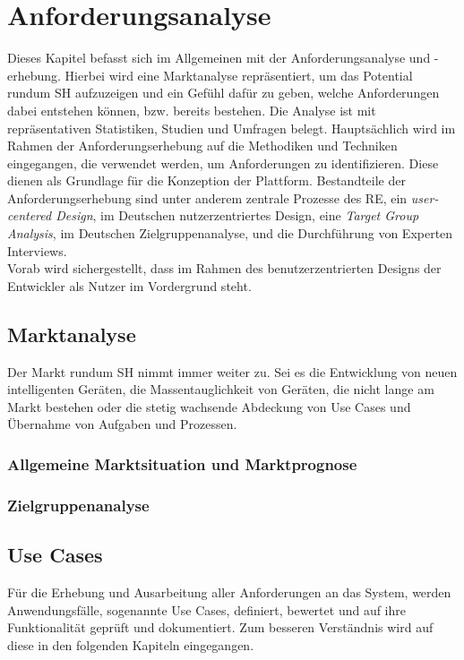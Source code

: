\chapter{Anforderungsanalyse}
\label{chap:anforderungsanalyse}
    Dieses Kapitel befasst sich im Allgemeinen mit der Anforderungsanalyse und -erhebung. Hierbei wird eine
    Marktanalyse repräsentiert, um das Potential rundum \acl{SH} aufzuzeigen und ein Gefühl 
    dafür zu geben, welche Anforderungen dabei entstehen können, bzw. bereits bestehen. Die Analyse ist 
    mit repräsentativen Statistiken, Studien und Umfragen belegt. Hauptsächlich wird im Rahmen der Anforderungserhebung 
    auf die Methodiken und Techniken eingegangen, die verwendet werden, um 
    Anforderungen zu identifizieren. Diese dienen als Grundlage für die Konzeption der Plattform. Bestandteile der 
    Anforderungserhebung sind unter anderem zentrale Prozesse des \acl{RE}, ein \textit{user-centered Design}, im Deutschen nutzerzentriertes Design, eine 
    \textit{Target Group Analysis}, im Deutschen Zielgruppenanalyse, und die Durchführung von Experten Interviews.
    \\
    Vorab wird sichergestellt, dass im Rahmen des benutzerzentrierten Designs der Entwickler als Nutzer im Vordergrund steht.
\section{Marktanalyse}
\label{sec:marktanalyse}
    Der Markt rundum \acl{SH} nimmt immer weiter zu. Sei es die Entwicklung von neuen intelligenten Geräten, die 
    Massentauglichkeit von Geräten, die nicht lange am Markt bestehen oder die stetig wachsende Abdeckung von 
    Use Cases und Übernahme von Aufgaben und Prozessen.

    \subsection{Allgemeine Marktsituation und Marktprognose}

    \subsection{Zielgruppenanalyse}


\section{Use Cases}
    Für die Erhebung und Ausarbeitung aller Anforderungen an das System, werden Anwendungsfälle, sogenannte Use Cases, 
    definiert, bewertet und auf ihre Funktionalität geprüft und dokumentiert. Zum besseren Verständnis wird auf diese in den 
    folgenden Kapiteln eingegangen. 
